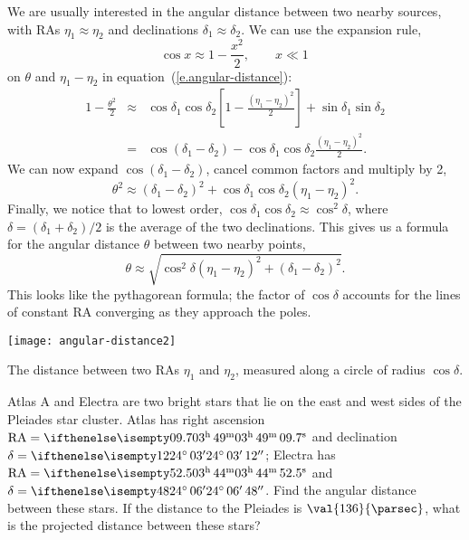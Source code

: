 We are usually interested in the angular distance between two nearby sources, with RAs $\eta_{1} \approx \eta_{2}$ and declinations $\delta_{1}\approx\delta_{2}$.  We can use the expansion rule,
\[ \cos x \approx 1 - \frac{x^{2}}{2},\qquad x \ll 1 \, \]
on $\theta$ and $\eta_{1}-\eta_{2}$ in equation~(\ref{e.angular-distance}):
\begin{eqnarray*}
	1-\frac{\theta^{2}}{2} &\approx& \cos\delta_{1}\cos\delta_{2} \left[1-\frac{(\eta_{1}-\eta_{2})^{2}}{2}\right] + \sin\delta_{1}\sin\delta_{2}\\
		&=& \cos(\delta_{1}-\delta_{2}) - \cos\delta_{1}\cos\delta_{2}\frac{(\eta_{1}-\eta_{2})^{2}}{2}.
\end{eqnarray*}
We can now expand $\cos(\delta_{1}-\delta_{2})$, cancel common factors and multiply by 2,
\[ \theta^{2} \approx (\delta_{1}-\delta_{2})^{2} + \cos\delta_{1}\cos\delta_{2}(\eta_{1} - \eta_{2})^{2}. \]
Finally, we notice that to lowest order, $\cos\delta_{1}\cos\delta_{2}\approx \cos^{2}\delta$, where $\delta = (\delta_{1}+\delta_{2})/2$ is the average of the two declinations.  This gives us a formula for the angular distance $\theta$ between two nearby points,
\begin{equation}
\theta \approx \sqrt{\cos^{2}\delta\left(\eta_{1}-\eta_{2}\right)^{2} + \left(\delta_{1}-\delta_{2}\right)^{2}}.
\end{equation}
This looks like the pythagorean formula; the factor of $\cos\delta$ accounts for the lines of constant RA converging as they approach the poles.

\begin{marginfigure}[4\baselineskip]
\texttt{[image: angular-distance2]}
\caption[Angular distance between lines of constant right ascension]{The distance between two RAs $\eta_{1}$ and $\eta_{2}$, measured along a circle of radius $\cos\delta$.}
\label{f.angular-pythagorean}
\end{marginfigure}

\begin{exercisebox}
Atlas A and Electra are two bright stars that lie on the east and west sides of the Pleiades star cluster.  Atlas has right ascension $\RA = \hrangle{03}{49}{09.7}$ and declination $\delta = \dec{24}{03}{12}$; Electra has $\RA = \hrangle{03}{44}{52.5}$ and $\delta = \dec{24}{06}{48}$.  Find the angular distance between these stars.  If the distance to the Pleiades is $\val{136}{\parsec}$, what is the projected distance between these stars?
\end{exercisebox}

